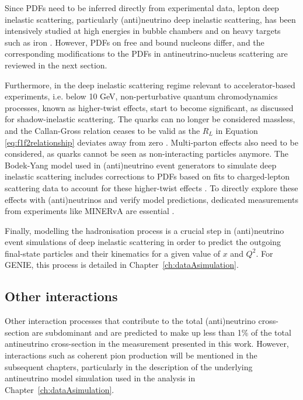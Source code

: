Since PDFs need to be inferred directly from experimental data, lepton deep inelastic scattering, particularly (anti)neutrino deep inelastic scattering, has been intensively studied at high energies in bubble chambers \cite{osti_991307, Aachen-Bonn-CERN-London-Oxford-Saclay:1978eks, Allasia:1982sb, WA25:1983qub} and on heavy targets such as iron \cite{cdhsw, ccfr, nutev_PhysRevD.74.012008}. However, PDFs on free and bound nucleons differ, and the corresponding modifications to the PDFs in antineutrino-nucleus scattering are reviewed in the next section.

Furthermore, in the deep inelastic scattering regime relevant to accelerator-based experiments, i.e. below 10 GeV, non-perturbative quantum chromodynamics processes, known as higher-twist effects, start to become significant, as discussed for shadow-inelastic scattering. The quarks can no longer be considered massless, and the Callan-Gross relation ceases to be valid as the $R_L$ in Equation \ref{eq:f1f2relationship} deviates away from zero \cite{RevModPhys.70.1341}. Multi-parton effects also need to be considered, as quarks cannot be seen as non-interacting particles anymore. The Bodek-Yang model used in (anti)neutrino event generators to simulate deep inelastic scattering includes corrections to PDFs based on fits to charged-lepton scattering data to account for these higher-twist effects \cite{BodekYang_2003, BODEK2005113}. To directly explore these effects with (anti)neutrinos and verify model predictions, dedicated measurements from experiments like MINERvA are essential \cite{PhysRevD.93.071101}.

Finally, modelling the hadronisation process is a crucial step in (anti)neutrino event simulations of deep inelastic scattering in order to predict the outgoing final-state particles and their kinematics for a given value of $x$ and $Q^2$. For GENIE, this process is detailed in Chapter~\ref{ch:dataAsimulation}.



\subsection{Other interactions}

Other interaction processes that contribute to the total (anti)neutrino cross-section are subdominant and are predicted to make up less than 1\% of the total antineutrino cross-section in the measurement presented in this work. However, interactions such as coherent pion production will be mentioned in the subsequent chapters, particularly in the description of the underlying antineutrino model simulation used in the analysis in Chapter~\ref{ch:dataAsimulation}.

